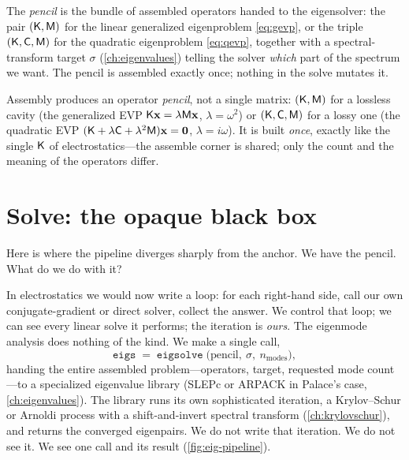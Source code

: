 \begin{definition}
The \emph{pencil} is the bundle of assembled operators handed to the eigensolver:
the pair $(\mathsf{K},\mathsf{M})$ for the linear generalized eigenproblem \cref{eq:gevp}, or
the triple $(\mathsf{K},\mathsf{C},\mathsf{M})$ for the quadratic eigenproblem \cref{eq:qevp},
together with a spectral-transform target $\sigma$ (\cref{ch:eigenvalues}) telling
the solver \emph{which} part of the spectrum we want. The pencil is assembled
exactly once; nothing in the solve mutates it.
\end{definition}

\begin{keyidea}
Assembly produces an operator \emph{pencil}, not a single matrix: $(\mathsf{K},\mathsf{M})$
for a lossless cavity (the generalized EVP $\mathsf{K}\mathbf{x}=\lambda\mathsf{M}\mathbf{x}$,
$\lambda=\omega^2$) or $(\mathsf{K},\mathsf{C},\mathsf{M})$ for a lossy one (the quadratic EVP
$(\mathsf{K}+\lambda\mathsf{C}+\lambda^2\mathsf{M})\mathbf{x}=\mathbf 0$, $\lambda=i\omega$). It is built
\emph{once}, exactly like the single $\mathsf{K}$ of electrostatics---the assemble
corner is shared; only the count and the meaning of the operators differ.
\end{keyidea}

\section{Solve: the opaque black box}
\label{sec:eig-solve}

Here is where the pipeline diverges sharply from the anchor. We have the pencil.
What do we do with it?

In electrostatics we would now write a loop: for each right-hand side, call our
own conjugate-gradient or direct solver, collect the answer. We control that
loop; we can see every linear solve it performs; the iteration is
\emph{ours}. The eigenmode analysis does nothing of the kind. We make a single
call,
\[
  \texttt{eigs} \;=\; \texttt{eigsolve}\;\bigl(\text{pencil},\ \sigma,\
  n_{\text{modes}}\bigr),
\]
handing the entire assembled problem---operators, target, requested mode
count---to a specialized eigenvalue library (SLEPc or ARPACK in Palace's case,
\cref{ch:eigenvalues}). The library runs its own sophisticated iteration, a
Krylov--Schur or Arnoldi process with a shift-and-invert spectral transform
(\cref{ch:krylovschur}), and returns the converged eigenpairs. We do not write
that iteration. We do not see it. We see one call and its result
(\cref{fig:eig-pipeline}).


